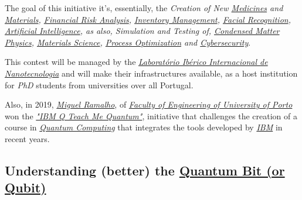 \documentclass[conference]{IEEEtran}
\begin{document}
\vspace{4pt}

The goal of this initiative it's, essentially, the \textit{Creation of New \href{https://en.wikipedia.org/wiki/Medication}{Medicines} and \href{https://en.wikipedia.org/wiki/Materials_science}{Materials}, \href{https://en.wikipedia.org/wiki/Financial_risk_management}{Financial Risk Analysis}, \href{https://en.wikipedia.org/wiki/Inventory}{Inventory Management}, \href{https://en.wikipedia.org/wiki/Facial_recognition_system}{Facial Recognition}, \href{https://en.wikipedia.org/wiki/Artificial_intelligence}{Artificial Intelligence}, as also, Simulation and Testing of, \href{https://en.wikipedia.org/wiki/Condensed_matter_physics}{Condensed Matter Physics}, \href{https://en.wikipedia.org/wiki/Materials_science}{Materials Science}, \href{https://en.wikipedia.org/wiki/Process_optimization}{Process Optimization} and \href{https://en.wikipedia.org/wiki/Computer_security}{Cybersecurity}}.

\vspace{4pt}

This contest will be managed by the \href{https://inl.int/}{\textit{Laborat\'orio Ib\'erico Internacional de Nanotecnologia}} and will make their infrastructures available, as a host institution for \textit{PhD} students from universities over all Portugal.

\vspace{4pt}

Also, in 2019, \href{https://noticias.up.pt/estudante-feup-vence-premio-internacional-em-computacao-quantica/}{\textit{Miguel Ramalho}}, of \href{https://sigarra.up.pt/feup/pt/web_page.inicial}{\textit{Faculty of Engineering of University of Porto}} won the \href{https://www.ibm.com/blogs/research/2019/01/ibmq-teach-quantum-winners/}{\textit{"IBM Q Teach Me Quantum"}}, initiative that challenges the creation of a course in \href{https://en.wikipedia.org/wiki/Quantum_computing}{\textit{Quantum Computing}} that integrates the tools developed by \href{https://en.wikipedia.org/wiki/IBM}{\textit{IBM}} in recent years.

\newpage

\subsection{Understanding (better) the \href{https://en.wikipedia.org/wiki/Qubit}{Quantum Bit (or Qubit)}}\label{AA}

\vspace{4pt}
\end{document}
